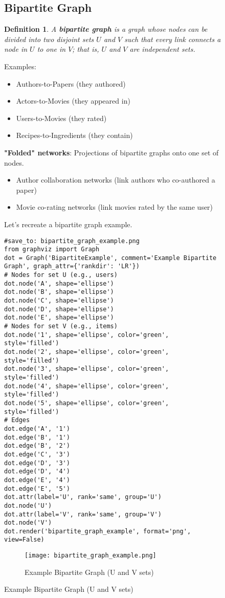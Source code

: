 \documentclass{article}
\newtheorem{definition}{Definition}
\newtheorem{definition}{Definition}
\begin{document}
\begin{figure}[h]
\subsection{Bipartite Graph}
\begin{definition}
A \textbf{bipartite graph} is a graph whose nodes can be divided into two disjoint sets $U$ and $V$ such that every link connects a node in $U$ to one in $V$; that is, $U$ and $V$ are independent sets.
\end{definition}
Examples:
\begin{itemize}
    \item Authors-to-Papers (they authored)
    \item Actors-to-Movies (they appeared in)
    \item Users-to-Movies (they rated)
    \item Recipes-to-Ingredients (they contain)
\end{itemize}
\textbf{"Folded" networks}: Projections of bipartite graphs onto one set of nodes.
\begin{itemize}
    \item Author collaboration networks (link authors who co-authored a paper)
    \item Movie co-rating networks (link movies rated by the same user)
\end{itemize}
Let's recreate a bipartite graph example.
\begin{verbatim}
#save_to: bipartite_graph_example.png
from graphviz import Graph
dot = Graph('BipartiteExample', comment='Example Bipartite Graph', graph_attr={'rankdir': 'LR'})
# Nodes for set U (e.g., users)
dot.node('A', shape='ellipse')
dot.node('B', shape='ellipse')
dot.node('C', shape='ellipse')
dot.node('D', shape='ellipse')
dot.node('E', shape='ellipse')
# Nodes for set V (e.g., items)
dot.node('1', shape='ellipse', color='green', style='filled')
dot.node('2', shape='ellipse', color='green', style='filled')
dot.node('3', shape='ellipse', color='green', style='filled')
dot.node('4', shape='ellipse', color='green', style='filled')
dot.node('5', shape='ellipse', color='green', style='filled')
# Edges
dot.edge('A', '1')
dot.edge('B', '1')
dot.edge('B', '2')
dot.edge('C', '3')
dot.edge('D', '3')
dot.edge('D', '4')
dot.edge('E', '4')
dot.edge('E', '5')
dot.attr(label='U', rank='same', group='U')
dot.node('U')
dot.attr(label='V', rank='same', group='V')
dot.node('V')
dot.render('bipartite_graph_example', format='png', view=False)
\end{verbatim}
\begin{figure}[h]
\centering
\texttt{[image: bipartite\_graph\_example.png]}
\caption{Example Bipartite Graph (U and V sets)}
\label{fig:bipartite_example}
\end{figure}

\end{figure}
\end{document}

